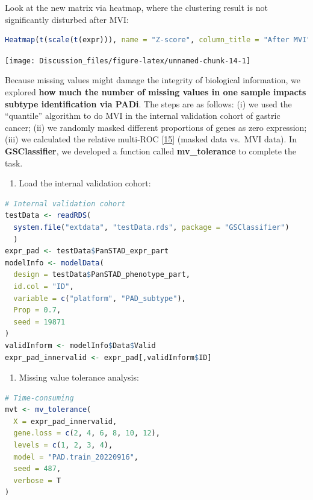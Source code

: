 \documentclass[
  12pt,
]{book}
\providecommand{\tightlist}{%
  \setlength{\itemsep}{0pt}\setlength{\parskip}{0pt}}
\begin{document}
Look at the new matrix via heatmap, where the clustering result is not significantly disturbed after MVI:

\begin{lstlisting}[language=R]
Heatmap(t(scale(t(expr))), name = "Z-score", column_title = "After MVI")
\end{lstlisting}

\begin{center}\texttt{[image: Discussion\_files/figure-latex/unnamed-chunk-14-1]} \end{center}

Because missing values might damage the integrity of biological information, we explored \textbf{how much the number of missing values in one sample impacts subtype identification via PADi}. The steps are as follows: (i) we used the ``quantile'' algorithm to do MVI in the internal validation cohort of gastric cancer; (ii) we randomly masked different proportions of genes as zero expression; (iii) we calculated the relative multi-ROC {[}\protect\hyperlink{ref-pROC}{15}{]} (masked data vs.~MVI data). In \textbf{GSClassifier}, we developed a function called \textbf{mv\_tolerance} to complete the task.

\begin{enumerate}
\def\labelenumi{(\roman{enumi})}
\tightlist
\item
  Load the internal validation cohort:
\end{enumerate}

\begin{lstlisting}[language=R]
# Internal validation cohort
testData <- readRDS(
  system.file("extdata", "testData.rds", package = "GSClassifier")
  )
expr_pad <- testData$PanSTAD_expr_part
modelInfo <- modelData(
  design = testData$PanSTAD_phenotype_part,
  id.col = "ID",
  variable = c("platform", "PAD_subtype"),
  Prop = 0.7,
  seed = 19871
)
validInform <- modelInfo$Data$Valid
expr_pad_innervalid <- expr_pad[,validInform$ID]
\end{lstlisting}

\begin{enumerate}
\def\labelenumi{(\roman{enumi})}
\setcounter{enumi}{1}
\tightlist
\item
  Missing value tolerance analysis:
\end{enumerate}

\begin{lstlisting}[language=R]
# Time-consuming
mvt <- mv_tolerance(
  X = expr_pad_innervalid,
  gene.loss = c(2, 4, 6, 8, 10, 12),
  levels = c(1, 2, 3, 4),
  model = "PAD.train_20220916",
  seed = 487,
  verbose = T
)
\end{lstlisting}
\end{document}
